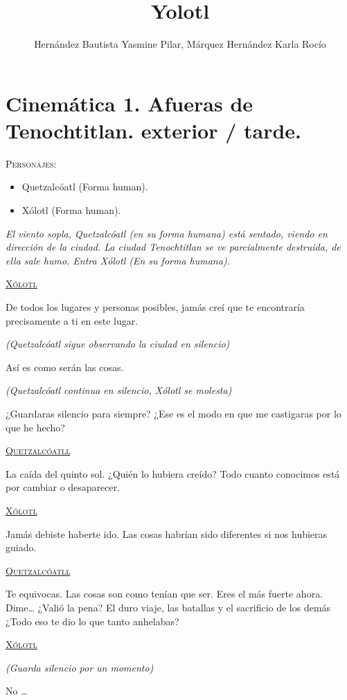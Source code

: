 \documentclass[11pt,letterpaper]{article}
\begin{document}
	\author{Hernández Bautista Yasmine Pilar, Márquez 		Hernández Karla Rocío}
	\title{Yolotl}
	\maketitle
	\tableofcontents
	\section{Cinemática 1. Afueras de Tenochtitlan. exterior / tarde.}
	
\textsc{Personajes}:
\begin{itemize}
	\item Quetzalcóatl (Forma human).
	\item Xólotl (Forma human).
\end{itemize}
\textit{El viento sopla, Quetzalcóatl (en su forma humana) está sentado, viendo en dirección de la ciudad. La ciudad Tenochtitlan se ve parcialmente destruida, de ella sale humo. Entra Xólotl (En su forma humana)}.
\begin{center}
\textsc{\underline{Xólotl}}
\par
De todos los lugares y personas posibles, jamás creí que te encontraría precisamente a ti en este lugar.
\par
\textit{(Quetzalcóatl sigue observando la ciudad en silencio)}
\par
Así es como serán las cosas.
\par 
\textit{(Quetzalcóatl continua en silencio, Xólotl se molesta)}
\par
¿Guardaras silencio para siempre? ¿Ese es el modo en que me castigaras por lo que he hecho?
\\
\par
\textsc{\underline{Quetzalcóatll}}
\par
La caída del quinto sol. ¿Quién lo hubiera creído? Todo cuanto conocimos está por cambiar o desaparecer.
\par
\par
\textsc{\underline{Xólotl}}
\\
\par
Jamás debiste haberte ido. Las cosas habrían sido diferentes si nos hubieras guiado.
\\
\par
\textsc{\underline{Quetzalcóatll}}
\par
Te equivocas. Las cosas son como tenían que ser. Eres el más fuerte ahora. Dime… ¿Valió la pena? El duro viaje, las batallas y el sacrificio de los demás ¿Todo eso te dio lo que tanto anhelabas?
\\
\par
\textsc{\underline{Xólotl}}
\\
\par
\textit{(Guarda silencio por un momento)}
\\
\par
No …
\end{center}
\end{document}
